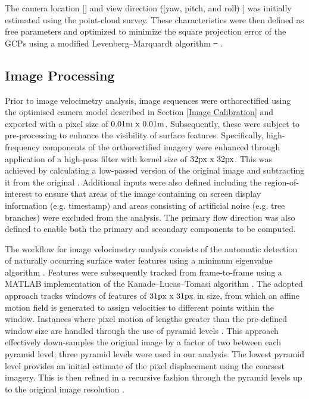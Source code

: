 \documentclass[hess, manuscript]{copernicus} %
\providecommand{\DIFadd}[1]{{\protect\color{blue}\uwave{#1}}} %
\providecommand{\DIFdel}[1]{{\protect\color{red}\sout{#1}}} %
\providecommand{\DIFaddbegin}{} %
\providecommand{\DIFaddend}{} %
\providecommand{\DIFdelbegin}{} %
\providecommand{\DIFdelend}{} %
\newcommand{\DIFscaledelfig}{0.5}
\newlength{\DIFdelgraphicswidth} %
\newlength{\DIFdelgraphicsheight} %
\newcommand{\DIFaddincludegraphics}[2][]{{\color{blue}\fbox{\DIFOincludegraphics[#1]{#2}}}} %
\newcommand{\DIFdelincludegraphics}[2][]{%
\sbox{\DIFdelgraphicsbox}{\DIFOincludegraphics[#1]{#2}}%
\settoboxwidth{\DIFdelgraphicswidth}{\DIFdelgraphicsbox} %
\settoboxtotalheight{\DIFdelgraphicsheight}{\DIFdelgraphicsbox} %
\scalebox{\DIFscaledelfig}{%
\parbox[b]{\DIFdelgraphicswidth}{\usebox{\DIFdelgraphicsbox}\\[-\baselineskip] \rule{\DIFdelgraphicswidth}{0em}}\llap{\resizebox{\DIFdelgraphicswidth}{\DIFdelgraphicsheight}{%
\setlength{\unitlength}{\DIFdelgraphicswidth}%
\begin{picture}(1,1)%
\thicklines\linethickness{2pt} %
{\color[rgb]{1,0,0}\put(0,0){\framebox(1,1){}}}%
{\color[rgb]{1,0,0}\put(0,0){\line( 1,1){1}}}%
{\color[rgb]{1,0,0}\put(0,1){\line(1,-1){1}}}%
\end{picture}%
}\hspace*{3pt}}} %
} %
\DeclareRobustCommand{\DIFaddbegin}{\DIFOaddbegin \let\includegraphics\DIFaddincludegraphics} %
\DeclareRobustCommand{\DIFaddend}{\DIFOaddend \let\includegraphics\DIFOincludegraphics} %
\DeclareRobustCommand{\DIFdelbegin}{\DIFOdelbegin \let\includegraphics\DIFdelincludegraphics} %
\DeclareRobustCommand{\DIFdelend}{\DIFOaddend \let\includegraphics\DIFOincludegraphics} %
\begin{document}
The camera location \DIFaddbegin [\DIFadd{x, y, z}] \DIFaddend and view direction \DIFdelbegin \DIFdel{(}\DIFdelend \DIFaddbegin [\DIFaddend yaw, pitch, and roll\DIFdelbegin \DIFdel{) }\DIFdelend \DIFaddbegin ] \DIFaddend was initially estimated using the point-cloud survey. These characteristics were then defined as free parameters and optimized to minimize the square projection error of the GCPs using a modified Levenberg–Marquardt algorithm \DIFdelbegin \DIFdel{\mbox{%
\citep{Fletcher1971}}\hskip0pt%
}\DIFdelend \DIFaddbegin \DIFadd{\mbox{%
\citep{Fletcher1971, Messerli2015}}\hskip0pt%
}\DIFaddend .

\subsection{Image Processing}
Prior to image velocimetry analysis, image sequences were orthorectified using the optimised camera model described in Section \ref{Image Calibration} and exported with a pixel size of $\textnormal{0.01m x 0.01m}$. Subsequently, these were subject to pre-processing to enhance the visibility of surface features. Specifically, high-frequency components of the orthorectified imagery were enhanced through application of a high-pass filter with kernel size of $\textnormal{32px x 32px}$. This was achieved by calculating a low-passed version of the original image and subtracting it from the original \citep{Thielicke2021}. Additional inputs were also defined including the region-of-interest to ensure that areas of the image containing on screen display information (e.g. timestamp) and areas consisting of artificial noise (e.g. tree branches) were excluded from the analysis. The primary flow direction was also defined to enable both the primary and secondary components to be computed. 

The workflow for image velocimetry analysis consists of the automatic detection of naturally occurring surface water features using a minimum eigenvalue algorithm \citep{Shi1994}. Features were subsequently tracked from frame-to-frame using a MATLAB implementation of the Kanade–Lucas–Tomasi algorithm \citep{Lucas1981, Tomasi1991, Shi1994, Perks2020a}. The adopted approach tracks windows of features of $\textnormal{31px x 31px}$ in size, from which an affine motion field is generated to assign velocities to different points within the window. Instances where pixel motion of lengths greater than the pre-defined window size are handled through the use of pyramid levels \citep{Bouguet2000}. This approach effectively down-samples the original image by a factor of two between each pyramid level; three pyramid levels were used in our analysis. The lowest pyramid level provides an initial estimate of the pixel displacement using the coarsest imagery. This is then refined in a recursive fashion through the pyramid levels up to the original image resolution \citep{Bouguet2000}.
\end{document}

